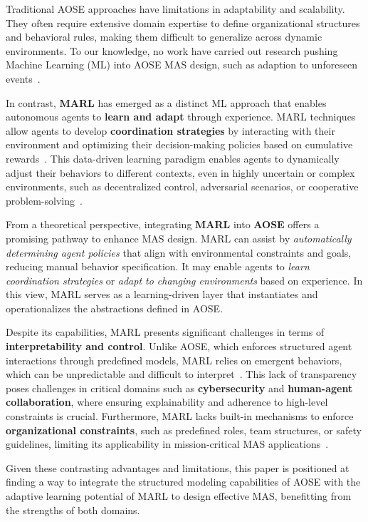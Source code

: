 \documentclass[pdflatex,sn-mathphys-num]{sn-jnl}%
\theoremstyle{thmstyleone}%
\theoremstyle{thmstyletwo}%
\theoremstyle{thmstylethree}%
\begin{document}
Traditional AOSE approaches have limitations in adaptability and scalability. They often require extensive domain expertise to define organizational structures and behavioral rules, making them difficult to generalize across dynamic environments. To our knowledge, no work have carried out research pushing Machine Learning (ML) into AOSE MAS design, such as adaption to unforeseen events~\cite{Garcia2004}.

In contrast, \textbf{MARL} has emerged as a distinct ML approach that enables autonomous agents to \textbf{learn and adapt} through experience. MARL techniques allow agents to develop \textbf{coordination strategies} by interacting with their environment and optimizing their decision-making policies based on cumulative rewards~\cite{Zhang2021}. This data-driven learning paradigm enables agents to dynamically adjust their behaviors to different contexts, even in highly uncertain or complex environments, such as decentralized control, adversarial scenarios, or cooperative problem-solving~\cite{Papoudakis2021}.

From a theoretical perspective, integrating \textbf{MARL} into \textbf{AOSE} offers a promising pathway to enhance MAS design. MARL can assist by \textit{automatically determining agent policies} that align with environmental constraints and goals, reducing manual behavior specification. It may enable agents to \textit{learn coordination strategies} or \textit{adapt to changing environments} based on experience. In this view, MARL serves as a learning-driven layer that instantiates and operationalizes the abstractions defined in AOSE.

Despite its capabilities, MARL presents significant challenges in terms of \textbf{interpretability and control}. Unlike AOSE, which enforces structured agent interactions through predefined models, MARL relies on emergent behaviors, which can be unpredictable and difficult to interpret~\cite{Du2022}. This lack of transparency poses challenges in critical domains such as \textbf{cybersecurity} and \textbf{human-agent collaboration}, where ensuring explainability and adherence to high-level constraints is crucial. Furthermore, MARL lacks built-in mechanisms to enforce \textbf{organizational constraints}, such as predefined roles, team structures, or safety guidelines, limiting its applicability in mission-critical MAS applications~\cite{Nguyen2020}.

Given these contrasting advantages and limitations, this paper is positioned at finding a way to integrate the structured modeling capabilities of AOSE with the adaptive learning potential of MARL to design effective MAS, benefitting from the strengths of both domains.
\end{document}
